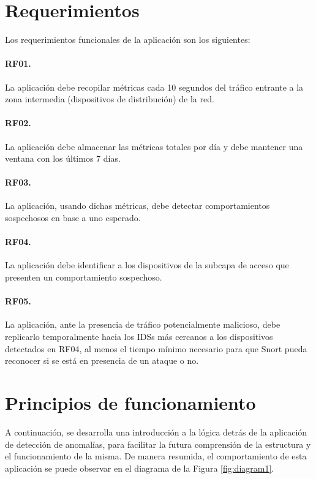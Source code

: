\section{Requerimientos} 

Los requerimientos funcionales de la aplicación son los siguientes:

\paragraph{RF01.} La aplicación debe recopilar métricas cada 10 segundos del
tráfico entrante a la zona intermedia (dispositivos de distribución) de la red.
\paragraph{RF02.} La aplicación debe almacenar las métricas totales por día y
debe mantener una ventana con los últimos 7 días.
\paragraph{RF03.} La aplicación, usando dichas métricas, debe detectar
comportamientos sospechosos en base a uno esperado.
\paragraph{RF04.} La aplicación debe identificar a los dispositivos de la
subcapa de acceso que presenten un comportamiento sospechoso.
\paragraph{RF05.} La aplicación, ante la presencia de tráfico potencialmente
malicioso, debe replicarlo temporalmente hacia los IDSs más cercanos a los
dispositivos detectados en RF04, al menos el tiempo mínimo necesario para que
Snort pueda reconocer si se está en presencia de un ataque o no.

\section{Principios de funcionamiento}

A continuación, se desarrolla una introducción a la lógica detrás de la
aplicación de detección de anomalías, para facilitar la futura comprensión de la
estructura y el funcionamiento de la misma. De manera resumida, el
comportamiento de esta aplicación se puede observar en el diagrama de la Figura
\ref{fig:diagram1}.

